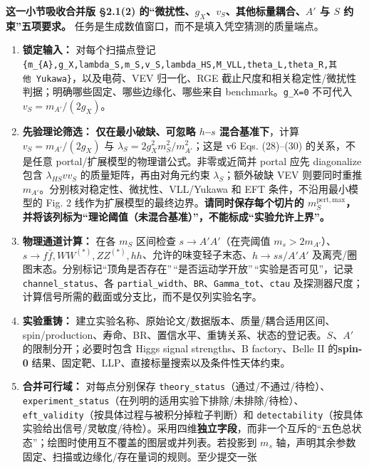 \documentclass[
  chinese,
  UTF8]{ctexart}
\providecommand{\tightlist}{%
  \setlength{\itemsep}{0pt}\setlength{\parskip}{0pt}}
\begin{document}
\textbf{这一小节吸收合并版 §2.1(2)
的``微扰性、\(g_X\)、\(v_S\)、其他标量耦合、\(A'\) 与 \(S\)
约束''五项要求。} 任务是生成数值窗口，而不是填入凭空猜测的质量端点。

\begin{enumerate}
\def\labelenumi{\arabic{enumi}.}
\tightlist
\item
  \textbf{锁定输入：} 对每个扫描点登记
  \texttt{\{m\_\{A\textquotesingle{}\},g\_X,lambda\_S,m\_S,v\_S,lambda\_HS,M\_VLL,theta\_L,theta\_R,其他\ Yukawa\}}，以及电荷、VEV
  归一化、RGE
  截止尺度和相关稳定性/微扰性判据；明确哪些固定、哪些边缘化、哪些来自
  benchmark。\texttt{g\_X=0} 不可代入 \(v_S=m_{A\prime}/(2g_X)\)。
\item
  \textbf{先验理论筛选：} \textbf{仅在最小破缺、可忽略 \(h\)--\(s\)
  混合基准下}，计算 \(v_S=m_{A'}/(2g_X)\) 与
  \(\lambda_S=2g_X^2m_S^2/m_{A'}^2\)；这是 v6 Eqs. (28)--(30)
  的关系，不是任意 portal/扩展模型的物理谱公式。非零或近简并 portal 应先
  diagonalize 包含 \(\lambda_{HS}vv_S\) 的质量矩阵，再由对角元约束
  \(\lambda_S\)；额外破缺 VEV 则要同时重推
  \(m_{A'}\)。分别核对稳定性、微扰性、VLL/Yukawa 和 EFT
  条件，不沿用最小模型的 Fig. 2
  线作为扩展模型的最终边界。\textbf{请同时保存每个切片的
  \(m_S^{\mathrm{pert,max}}\)，并将该列标为``理论阈值（未混合基准）''，不能标成``实验允许上界''。}
\item
  \textbf{物理通道计算：} 在各 \(m_S\) 区间检查 \(s\to A'A'\)（在壳阈值
  \(m_s>2m_{A'}\)）、\(s\to f\bar f,WW^{(*)},ZZ^{(*)},hh\)、允许的味变轻子末态、\(h\to ss/A'A'\)
  及离壳/圈图末态。分别标记``顶角是否存在''\,``是否运动学开放''\,``实验是否可见''，记录
  \texttt{channel\_status}、各
  \texttt{partial\_width}、\texttt{BR}、\texttt{Gamma\_tot}、\texttt{ctau}
  及探测器尺度；计算信号所需的截面或分支比，而不是仅列实验名字。
\item
  \textbf{实验重铸：}
  建立实验名称、原始论文/数据版本、质量/耦合适用区间、spin/production、寿命、BR、置信水平、重铸关系、状态的登记表。\(S\)、\(A'\)
  的限制分开；必要时包含 Higgs signal strengths、B factory、Belle II
  的\textbf{spin-0} 结果、固定靶、LLP、直接标量搜索以及条件性天体约束。
\item
  \textbf{合并可行域：} 对每点分别保存
  \texttt{theory\_status}（通过/不通过/待检）、\texttt{experiment\_status}（在列明的适用实验下排除/未排除/待检）、\texttt{eft\_validity}（按具体过程与被积分掉粒子判断）和
  \texttt{detectability}（按具体实验给出信号/灵敏度/待检）。采用四维\textbf{独立字段}，而非一个互斥的``五色总状态''；绘图时使用互不覆盖的图层或并列表。若投影到
  \(m_s\)
  轴，声明其余参数固定、扫描或边缘化/存在量词的规则。至少提交一张

\end{enumerate}
\end{document}
